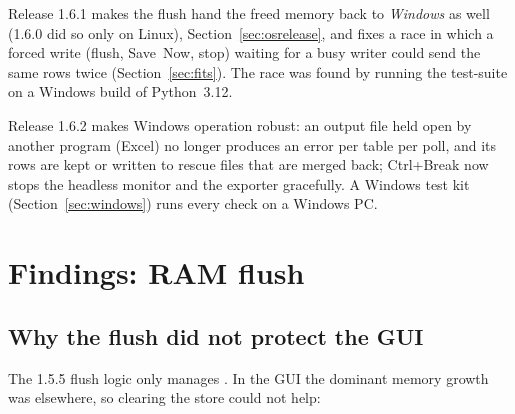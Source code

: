 \documentclass[11pt,a4paper]{article}
\newcommand{\code}[1]{\texttt{\detokenize{#1}}}
\begin{document}
Release 1.6.1 makes the flush hand the freed memory back to \emph{Windows}
as well (1.6.0 did so only on Linux), Section~\ref{sec:osrelease}, and fixes a
race in which a forced write (flush, Save~Now, stop) waiting for a busy writer
could send the same rows twice (Section~\ref{sec:fits}). The race was found by
running the test-suite on a Windows build of Python~3.12.

Release 1.6.2 makes Windows operation robust: an output file held open by
another program (Excel) no longer produces an error per table per poll, and
its rows are kept or written to rescue files that are merged back; Ctrl+Break
now stops the headless monitor and the exporter gracefully. A Windows test
kit (Section~\ref{sec:windows}) runs every check on a Windows PC.

\section{Findings: RAM flush}\label{sec:ramflush}
\subsection{Why the flush did not protect the GUI}
The 1.5.5 flush logic only manages \code{TIME_SERIES_STORE}. In the GUI the
dominant memory growth was elsewhere, so clearing the store could not help:
\end{document}
